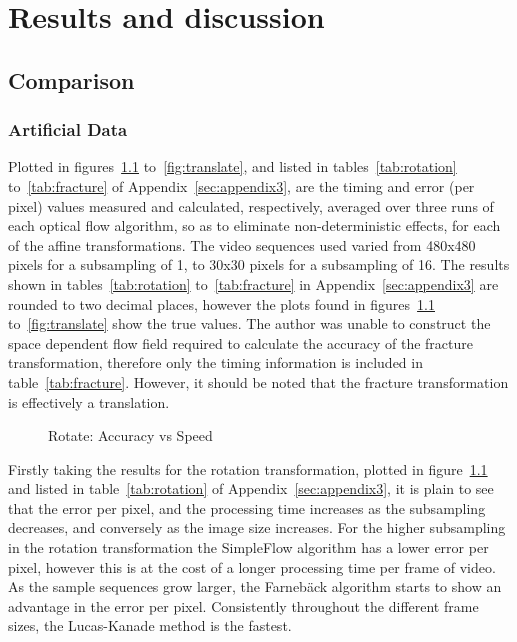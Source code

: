 \chapter{Results and discussion}
\label{sec:results}

\ifpdf
    \graphicspath{{Section4/Figs/Raster/}{Section4/Figs/PDF/}{Section4/Figs/}}
\else
    \graphicspath{{Section4/Figs/Vector/}{Section4/Figs/}}
\fi

\section{Comparison}

\subsection{Artificial Data}

Plotted in figures~\ref{fig:rotate} to~\ref{fig:translate}, and listed in tables~\ref{tab:rotation} to~\ref{tab:fracture} of Appendix~\ref{sec:appendix3}, are the timing and error (per pixel) values measured and calculated, respectively, averaged over three runs of each optical flow algorithm, so as to eliminate non-deterministic effects, for each of the affine transformations. The video sequences used varied from 480x480 pixels for a subsampling of 1, to 30x30 pixels for a subsampling of 16. The results shown in tables~\ref{tab:rotation} to~\ref{tab:fracture} in Appendix~\ref{sec:appendix3} are rounded to two decimal places, however the plots found in figures~\ref{fig:rotate} to~\ref{fig:translate} show the true values. The author was unable to construct the space dependent flow field required to calculate the accuracy of the fracture transformation, therefore only the timing information is included in table~\ref{tab:fracture}. However, it should be noted that the fracture transformation is effectively a translation.

\begin{figure}[h]
  \centering
  \caption{Rotate: Accuracy vs Speed}
  \label{fig:rotate}
\end{figure}

Firstly taking the results for the rotation transformation, plotted in figure~\ref{fig:rotate} and listed in table~\ref{tab:rotation} of Appendix~\ref{sec:appendix3}, it is plain to see that the error per pixel, and the processing time increases as the subsampling decreases, and conversely as the image size increases. For the higher subsampling in the rotation transformation the SimpleFlow algorithm has a lower error per pixel, however this is at the cost of a longer processing time per frame of video. As the sample sequences grow larger, the Farnebäck algorithm starts to show an advantage in the error per pixel. Consistently throughout the different frame sizes, the Lucas-Kanade method is the fastest.

